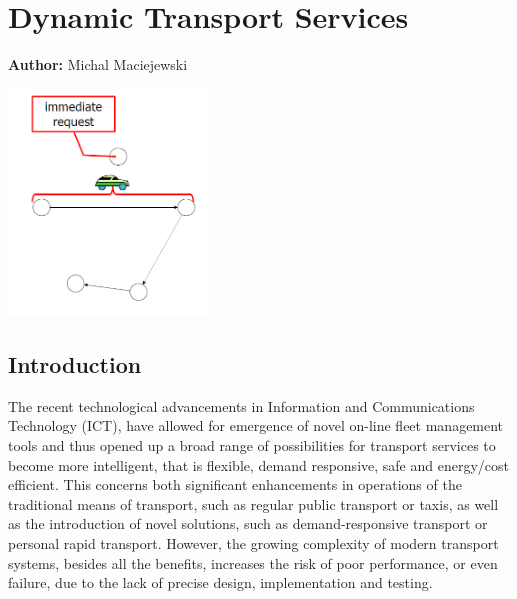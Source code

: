 \chapter{Dynamic Transport Services }
\label{ch:dts}

\hfill \textbf{Author:} Michal Maciejewski

\begin{center} \includegraphics[width=0.4\textwidth, angle=0]{extending/figures/DTS/dts.png}  \end{center}



\section{Introduction}

The recent technological advancements in Information and Communications Technology (ICT), have allowed for emergence of novel on-line fleet management tools and thus opened up a broad range of possibilities for transport services to become more intelligent, that is flexible, demand responsive, safe and energy/cost efficient. This concerns both significant enhancements in operations of the traditional means of transport, such as regular public transport or taxis, as well as the introduction of novel solutions, such as demand-responsive transport or personal rapid transport. However, the growing complexity of modern transport systems, besides all the benefits, increases the risk of poor performance, or even failure, due to the lack of precise design, implementation and testing.

